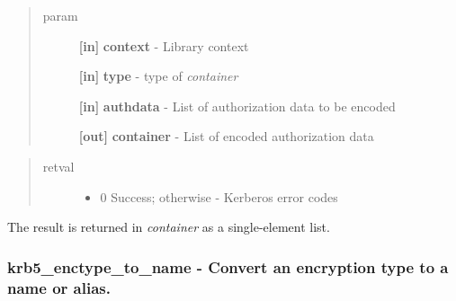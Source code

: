 \documentclass[letterpaper,10pt,english]{sphinxmanual}
\begin{document}
\begin{quote}\begin{description}
\item[{param}] \leavevmode
\textbf{{[}in{]}} \textbf{context} - Library context

\textbf{{[}in{]}} \textbf{type} -  type of \emph{container}

\textbf{{[}in{]}} \textbf{authdata} - List of authorization data to be encoded

\textbf{{[}out{]}} \textbf{container} - List of encoded authorization data

\end{description}\end{quote}
\begin{quote}\begin{description}
\item[{retval}] \leavevmode\begin{itemize}
\item {} 
0   Success; otherwise - Kerberos error codes

\end{itemize}

\end{description}\end{quote}

The result is returned in \emph{container} as a single-element list.




{\hyperref[appdev/refs/api/krb5_decode_authdata_container:c.krb5_decode_authdata_container]{}}




\subsubsection{krb5\_enctype\_to\_name -  Convert an encryption type to a name or alias.}
\label{appdev/refs/api/krb5_enctype_to_name::doc}\label{appdev/refs/api/krb5_enctype_to_name:krb5-enctype-to-name-convert-an-encryption-type-to-a-name-or-alias}

\begin{fulllineitems}
\label{appdev/refs/api/krb5_enctype_to_name:c.krb5_enctype_to_name}
\end{fulllineitems}
\end{document}
